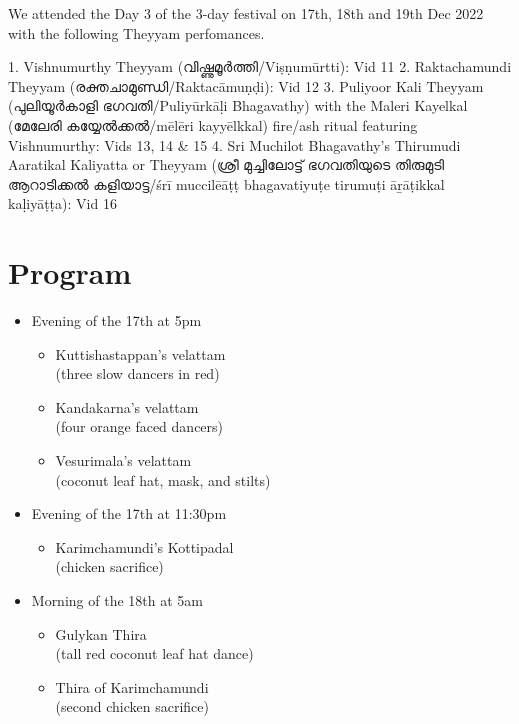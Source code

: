 \documentclass[a4paper, 11pt]{article} %
\begin{document}
We attended the Day 3 of the 3-day festival on 17th, 18th and 19th Dec 2022 with the following Theyyam perfomances.

1. Vishnumurthy Theyyam (വിഷ്ണുമൂർത്തി/Viṣṇumūrtti): Vid 11
2. Raktachamundi Theyyam (രക്തചാമുണ്ഡി/Raktacāmuṇḍi): Vid 12
3. Puliyoor Kali Theyyam (പുലിയൂർകാളി ഭഗവതി/Puliyūrkāḷi Bhagavathy) with the Maleri Kayelkal (മേലേരി കയ്യേൽക്കൽ/mēlēri kayyēlkkal) fire/ash ritual featuring Vishnumurthy: Vids 13, 14 & 15
4. Sri Muchilot Bhagavathy's Thirumudi Aaratikal Kaliyatta or Theyyam (ശ്രീ മുച്ചിലോട്ട് ഭഗവതിയുടെ തിരുമുടി ആറാടിക്കൽ കളിയാട്ട/śrī muccilēāṭṭ bhagavatiyuṭe tirumuṭi āṟāṭikkal kaḷiyāṭṭa): Vid 16

\section{Program}%
  \label{sec:Program}
  
\begin{itemize}
  \item Evening of the 17th at 5pm
  \begin{itemize}
    \item Kuttishastappan's velattam\\
      (three slow dancers in red)
    \item Kandakarna's velattam\\
      (four orange faced dancers)
    \item Vesurimala's velattam\\
      (coconut leaf hat, mask, and stilts)
  \end{itemize}
  \item Evening of the 17th at 11:30pm
  \begin{itemize}
    \item Karimchamundi's Kottipadal\\
      (chicken sacrifice)
  \end{itemize}
  \item Morning of the 18th at 5am
  \begin{itemize}
    \item Gulykan Thira\\
      (tall red coconut leaf hat dance)
    \item Thira of Karimchamundi\\
      (second chicken sacrifice)
  \end{itemize}
\end{itemize}















\vfill

\end{document}
